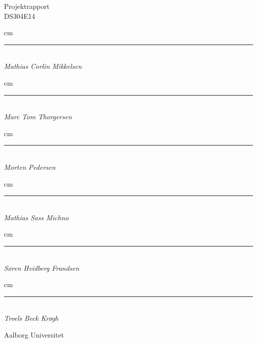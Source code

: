   \begin{center}
    {\large
      Projektrapport%
    }\\
    \vspace{0.2cm}
    {\Large
      DS304E14%
    }
		\vspace{2 cm}
		\begin{flushleft}
			 cm
			\Large
      \begin{minipage}{0.45\textwidth}
      \centering
      \rule{\textwidth}{0.5pt}\\
			\textit{Mathias Corlin Mikkelsen}
      \end{minipage}
		\end{flushleft}
		\begin{flushright}
			\hangindent=2 cm
			\Large
      \begin{minipage}{0.45\textwidth}
      \centering
      \rule{\textwidth}{0.5pt}\\
			\textit{Marc Tom Thorgersen}
		  \end{minipage}
    \end{flushright}
		\begin{flushleft}
			\parindent=2 cm
			\Large
      \begin{minipage}{0.45\textwidth}
      \centering
      \rule{\textwidth}{0.5pt}\\
			\textit{Morten Pedersen}
		  \end{minipage}
    \end{flushleft}
		\begin{flushright}
			 cm
			\Large
      \begin{minipage}{0.45\textwidth}
      \centering
      \rule{\textwidth}{0.5pt}\\
			\textit{Mathias Sass Michno}
		  \end{minipage}
    \end{flushright}
		\begin{flushleft}
			\hangindent=2 cm
			\Large
      \begin{minipage}{0.45\textwidth}
      \centering
      \rule{\textwidth}{0.5pt}\\
			\textit{Søren Hvidberg Frandsen}
		  \end{minipage}
    \end{flushleft}
		\begin{flushright}
			\hangindent=2 cm
			\Large
      \begin{minipage}{0.45\textwidth}
      \centering
      \rule{\textwidth}{0.5pt}\\
			\textit{Troels Beck Krøgh}
		  \end{minipage}
    \end{flushright}

  \end{center}
  \vfill
  \begin{center}
  Aalborg Universitet\\
  \end{center}
